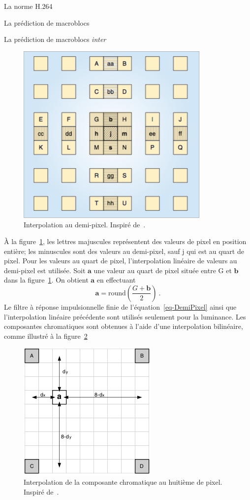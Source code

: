 \documentclass[letterpaper, twoside, 12pt,memoire]{thETS}
\newcommand{\fig}[1]{figure~\ref{#1}}
\begin{document}
\begin{chapter}{La norme H.264}
\begin{section}{La prédiction de macroblocs}
\begin{subsection}{La prédiction de macroblocs \textit{inter}}
\begin{figure}[htb]
\centering
\includegraphics[scale=0.5]{images/HalfPel.png}
\caption{Interpolation au demi-pixel. Inspiré de~\cite{richardson2003}.}
\label{fig-HalfPel}
\end{figure}

À la figure~\ref{fig-HalfPel}, les lettres majuscules représentent des valeurs
de pixel en position entière; les minuscules sont des valeurs au demi-pixel,
sauf j qui est au quart de pixel. Pour les valeurs au quart de pixel,
l'interpolation linéaire de valeurs au demi-pixel est utilisée. Soit $\mathbf{a}$ une valeur au quart de
pixel située entre G et $\mathbf{b}$ dans la \fig{fig-HalfPel}. On obtient
$\mathbf{a}$ en effectuant
\begin{equation}
\mathbf{a} = \text{round} \left(\frac{G + \mathbf{b} }{2} \right)\:.
\end{equation}
Le filtre à réponse impulsionnelle finie de l'équation~\ref{eq-DemiPixel} ainsi
que l'interpolation linéaire précédente sont utilisés seulement pour la
luminance. Les composantes chromatiques sont obtenues à l'aide d'une
interpolation bilinéaire, comme illustré à la figure~\ref{fig-ChromaPel}

\begin{figure}[htb]
\centering
\includegraphics[width=0.5\linewidth]{images/ChromaPel.png}
\caption{Interpolation de la composante chromatique au huitième de pixel.
Inspiré de~\cite{richardson2003}.}
\label{fig-ChromaPel}
\end{figure}


\end{subsection}
\end{section}
\end{chapter}
\end{document}

